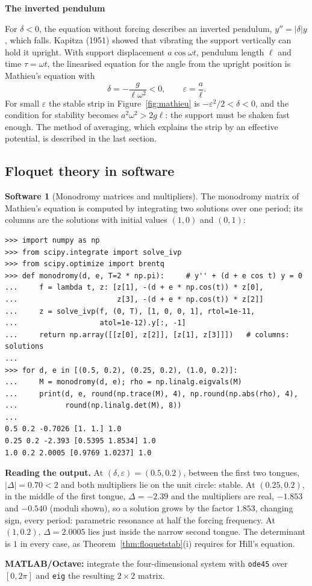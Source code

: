 \documentclass[11pt,a4paper]{article}
\numberwithin{equation}{section}
\theoremstyle{definition}
\newtheorem{software}[thm]{Software}
\newcommand{\subhead}[1]{%
  \par\medskip\noindent\textbf{#1}\par\nobreak\smallskip}
\begin{document}
\subhead{The inverted pendulum}
For $\delta < 0$, the equation without forcing describes an inverted pendulum, $y'' = |\delta|y$, which falls. Kapitza (1951) showed that vibrating the support vertically can hold it upright. With
support displacement $a\cos\omega t$, pendulum length $\ell$ and time $\tau = \omega t$, the linearised equation for the angle from the upright position is Mathieu's equation with
\[
\delta = -\frac{g}{\ell\omega^2} < 0, \qquad \varepsilon = \frac a\ell .
\]
For small $\varepsilon$ the stable strip in Figure~\ref{fig:mathieu} is $-\varepsilon^2/2 < \delta < 0$, and the condition for stability becomes $a^2\omega^2 > 2g\ell$: the support must be shaken fast enough. The method of averaging,
which explains the strip by an effective potential, is described in the last section.

\subsection{Floquet theory in software}
\label{ssec:software7}

\begin{software}[Monodromy matrices and multipliers]
\label{sw:monodromy}
The monodromy matrix of Mathieu's equation is computed by integrating two solutions over one period; its columns are the solutions with initial values $(1, 0)$ and $(0, 1)$:
{\small\begin{verbatim}
>>> import numpy as np
>>> from scipy.integrate import solve_ivp
>>> from scipy.optimize import brentq
>>> def monodromy(d, e, T=2 * np.pi):     # y'' + (d + e cos t) y = 0
...     f = lambda t, z: [z[1], -(d + e * np.cos(t)) * z[0],
...                       z[3], -(d + e * np.cos(t)) * z[2]]
...     z = solve_ivp(f, (0, T), [1, 0, 0, 1], rtol=1e-11,
...                   atol=1e-12).y[:, -1]
...     return np.array([[z[0], z[2]], [z[1], z[3]]])   # columns: solutions
...
>>> for d, e in [(0.5, 0.2), (0.25, 0.2), (1.0, 0.2)]:
...     M = monodromy(d, e); rho = np.linalg.eigvals(M)
...     print(d, e, round(np.trace(M), 4), np.round(np.abs(rho), 4),
...           round(np.linalg.det(M), 8))
...
0.5 0.2 -0.7026 [1. 1.] 1.0
0.25 0.2 -2.393 [0.5395 1.8534] 1.0
1.0 0.2 2.0005 [0.9769 1.0237] 1.0
\end{verbatim}}
\textbf{Reading the output.} At $(\delta, \varepsilon) = (0.5, 0.2)$, between the first two tongues, $|\Delta| = 0.70 < 2$ and both multipliers lie on the unit circle: stable. At $(0.25, 0.2)$, in the middle of the first
tongue, $\Delta = -2.39$ and the multipliers are real, $-1.853$ and $-0.540$ (moduli shown), so a solution grows by the factor $1.853$, changing sign, every period: parametric resonance at half the
forcing frequency. At $(1, 0.2)$, $\Delta = 2.0005$ lies just inside the narrow second tongue. The determinant is $1$ in every case, as Theorem~\ref{thm:floquetstab}(i) requires for Hill's equation.

\textbf{MATLAB/Octave:} integrate the four-dimensional system with \texttt{ode45} over $[0, 2\pi]$ and \texttt{eig} the resulting $2 \times 2$ matrix.
\end{software}
\end{document}
